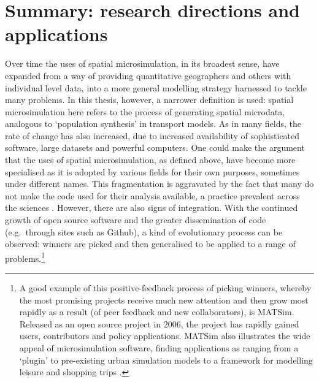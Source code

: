\section{Summary: research directions and applications}
\label{s:bigdata-gps}
Over time the uses of spatial microsimulation, in its broadest sense,
have expanded from a way of
providing quantitative geographers and others with individual level data, into a more
general modelling strategy harnessed to tackle many problems.
In this thesis, however, a narrower definition is used:
spatial microsimulation here refers to the process of generating spatial
microdata, analogous to `population synthesis' in transport models.
As in many fields, the
rate of change has also increased, due to increased availability of
sophisticated software, large datasets and powerful
computers. One could make the argument that the
uses of spatial microsimulation, as defined above, have become more specialised
as it is adopted by various fields for their own purposes, sometimes under
different names. This fragmentation is aggravated by the fact that
many do not make the code used for their analysis available, a
practice prevalent across the sciences \citep{Ince2012}.
However, there are also signs of integration. With the continued growth of
open source software and the greater dissemination of code
(e.g.~through sites such as Github), a kind of evolutionary process can be observed:
winners are picked and then generalised to be applied to a range of
problems.\footnote{A
good example of this positive-feedback process of picking winners, whereby
the most promising projects receive much new attention and then grow most
rapidly as a result (of peer feedback and new collaborators), is MATSim.
Released as an open source project in 2006, the project has rapidly gained
users, contributors and policy applications. MATSim also illustrates the
wide appeal of microsimulation software, finding applications as ranging from
a `plugin' to pre-existing urban simulation models to a framework for
modelling leisure and shopping trips \citep{Nicolai2012-matsim, horni2009location}.
}

